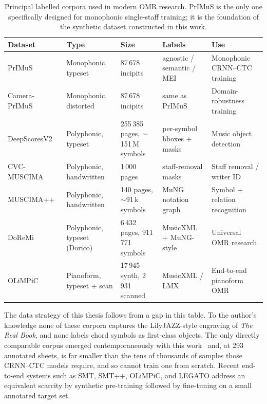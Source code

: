 \begin{table}[htbp]
\centering
\small
\setlength{\tabcolsep}{5pt}
\renewcommand{\arraystretch}{1.35}
\begin{tabularx}{\textwidth}{@{} l L L L L @{}}
\toprule
\textbf{Dataset} & \textbf{Type} & \textbf{Size} & \textbf{Labels} & \textbf{Use} \\
\midrule
PrIMuS~\cite{PrIMuSDataset,calvoZaragozaEndToEndNeural2018} & Monophonic, typeset  & 87\,678 incipits                       & agnostic / semantic / MEI  & Monophonic CRNN--CTC training \\ \tfgrowsep
Camera-PrIMuS~\cite{calvoZaragozaCameraPrimus2018} & Monophonic, distorted        & 87\,678 incipits                       & same as PrIMuS             & Domain-robustness training \\ \tfgrowsep
DeepScoresV2~\cite{tuggenerDeepScoresV22020}      & Polyphonic, typeset           & 255\,385 pages, $\sim$151\,M symbols   & per-symbol bboxes + masks  & Music object detection \\ \tfgrowsep
CVC-MUSCIMA~\cite{fornesCVCMUSCIMAGroundTruth2012} & Polyphonic, handwritten      & 1\,000 pages                           & staff-removal masks        & Staff removal / writer ID \\ \tfgrowsep
MUSCIMA++~\cite{hajicMuscimaPP2017}               & Polyphonic, handwritten       & 140 pages, $\sim$91\,k symbols         & MuNG notation graph        & Symbol + relation recognition \\ \tfgrowsep
DoReMi~\cite{shatriDoReMi2021}                    & Polyphonic, typeset (Dorico)  & 6\,432 pages, 911\,771 symbols & MusicXML + MuNG-style      & Universal OMR research \\ \tfgrowsep
OLiMPiC~\cite{mayerPracticalEndToEnd2024}         & Pianoform, typeset + scan     & 17\,945 synth, 2\,931 scanned    & MusicXML / LMX             & End-to-end pianoform OMR \\
\bottomrule
\end{tabularx}
\caption{Principal labelled corpora used in modern OMR research.
PrIMuS is the only one specifically designed for monophonic single-staff
training; it is the foundation of the synthetic dataset constructed in
this work.}
\label{tab:omr-datasets}
\end{table}

The data strategy of this thesis follows from a gap in this table.
To the author's knowledge none of these corpora captures the
LilyJAZZ-style engraving of \textit{The Real Book}, and none labels chord
symbols as first-class objects. The only directly comparable corpus emerged
contemporaneously with this work~\cite{martinezSevillaJazzLeadSheets2025}
and, at 293 annotated sheets, is far smaller than the tens of
thousands of samples those CRNN--CTC models require, and so cannot train
one from scratch. Recent end-to-end
systems such as SMT, SMT++, OLiMPiC, and LEGATO address an
equivalent scarcity by synthetic pre-training followed by fine-tuning on a
small annotated target set.

